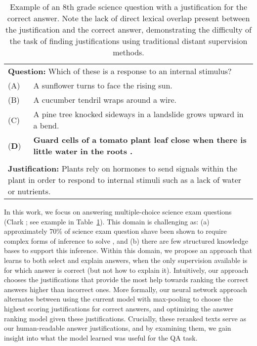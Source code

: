 \begin{table}[t]
\begin{center}
\begin{footnotesize}
\begin{tabularx}{\linewidth}{p{0.13cm}p{6.8cm}}
\multicolumn{2}{p{8cm}}{\textbf{Question:} Which of these is a response to an internal stimulus?} \\
 (A) & A sunflower turns to face the rising sun. \\
 (B) & A cucumber tendril wraps around a wire. \\
 (C) &  A pine tree knocked sideways in a landslide grows upward in a bend. \\
 (\textbf{D}) &\textbf{Guard cells of a tomato plant leaf close when there is little water in the roots .} \\
\\
\multicolumn{2}{p{7.2cm}}{\textbf{Justification:} 
Plants rely on hormones to send signals within the plant in order to respond to internal stimuli such as a lack of water or nutrients. } \\

\end{tabularx}
\end{footnotesize}
\caption{{  Example of an 8th grade science question with a justification for the correct answer.  Note the lack of direct lexical overlap present between the justification and the correct answer, demonstrating the difficulty of the task of finding justifications using traditional distant supervision methods. }}
\label{tab:question_example}
\end{center}
\end{table}

In this work, we focus on answering multiple-choice science exam questions (Clark \citeyear{clark:2015}; see example in Table~\ref{tab:question_example}). 
This domain is challenging as: (a) approximately 70\% of science exam question shave been shown to require complex forms of inference to solve \cite{clark:2013,jansen-EtAl:2016:COLING}, and (b) there are few structured knowledge bases to support this inference.  
Within this domain, we propose an approach that learns to both select and explain answers, when the only supervision available is for which answer is correct (but not how to explain it).
Intuitively, our approach chooses the justifications that provide the most help towards ranking the correct answers higher than incorrect ones.
More formally, our neural network approach alternates between using the current model with max-pooling to choose the highest scoring justifications for correct answers, and optimizing the answer ranking model given these justifications. 
Crucially, these reranked texts serve as our human-readable answer justifications, and by examining them, we gain insight into what the model learned was useful for the QA task.   


